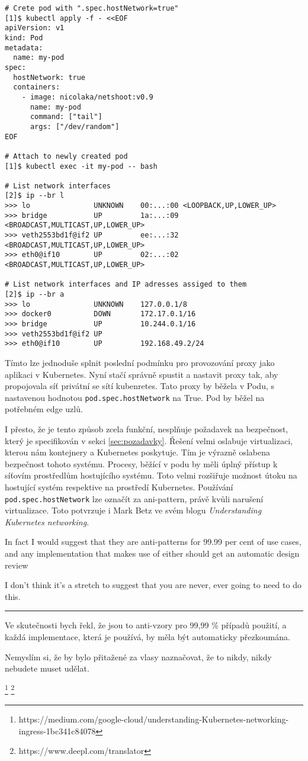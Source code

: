 \begin{verbatim}
# Crete pod with ".spec.hostNetwork=true"
[1]$ kubectl apply -f - <<EOF
apiVersion: v1
kind: Pod
metadata:
  name: my-pod
spec:
  hostNetwork: true
  containers:
    - image: nicolaka/netshoot:v0.9
      name: my-pod
      command: ["tail"]
      args: ["/dev/random"]
EOF

# Attach to newly created pod
[1]$ kubectl exec -it my-pod -- bash

# List network interfaces
[2]$ ip --br l
>>> lo               UNKNOWN    00:...:00 <LOOPBACK,UP,LOWER_UP> 
>>> bridge           UP         1a:...:09 <BROADCAST,MULTICAST,UP,LOWER_UP> 
>>> veth2553bd1f@if2 UP         ee:...:32 <BROADCAST,MULTICAST,UP,LOWER_UP> 
>>> eth0@if10        UP         02:...:02 <BROADCAST,MULTICAST,UP,LOWER_UP>

# List network interfaces and IP adresses assiged to them
[2]$ ip --br a
>>> lo               UNKNOWN    127.0.0.1/8 
>>> docker0          DOWN       172.17.0.1/16 
>>> bridge           UP         10.244.0.1/16 
>>> veth2553bd1f@if2 UP
>>> eth0@if10        UP         192.168.49.2/24
\end{verbatim}

Tímto lze jednoduše splnit poslední podmínku pro provozování proxy jako aplikaci v Kubernetes. Nyní stačí správně spustit a nastavit proxy tak, aby propojovala síť privátní se sítí kubenretes. Tato proxy by běžela v Podu, s nastavenou hodnotou \verb|pod.spec.hostNetwork| na True. Pod by běžel na potřebném edge uzlů.

I přesto, že je tento způsob zcela funkční, nesplňuje požadavek na bezpečnost, který je specifikován v sekci \ref{sec:pozadavky}. Řešení velmi oslabuje virtualizaci, kterou nám kontejnery a Kubernetes poskytuje. Tím je výrazně oslabena bezpečnost tohoto systému. Procesy, běžící v podu by měli úplný přístup k síťovím prostředlům hostujícího systému. Toto velmi rozšiřuje možnost útoku na hostující systém respektive na prostředí Kubernetes. Používání \verb|pod.spec.hostNetwork| lze označít za ani-pattern, právě kvůli narušení virtualizace. Toto potvrzuje i Mark Betz ve svém blogu \textit{Understanding Kubernetes networking}. 

\begin{displayquote}
In fact I would suggest that they are anti-patterns for 99.99 per cent of use cases, and any implementation that makes use of either should get an automatic design review

I don’t think it’s a stretch to suggest that you are never, ever going to need to do this.
\end{displayquote}
\noindent\rule{2cm}{0.4pt}
\begin{displayquote}
Ve skutečnosti bych řekl, že jsou to anti-vzory pro 99,99 \% případů použití, a každá implementace, která je používá, by měla být automaticky přezkoumána.

Nemyslím si, že by bylo přitažené za vlasy naznačovat, že to nikdy, nikdy nebudete muset udělat.
\end{displayquote}
\footnote{https://medium.com/google-cloud/understanding-Kubernetes-networking-ingress-1bc341c84078} 
\footnote{https://www.deepl.com/translator}

